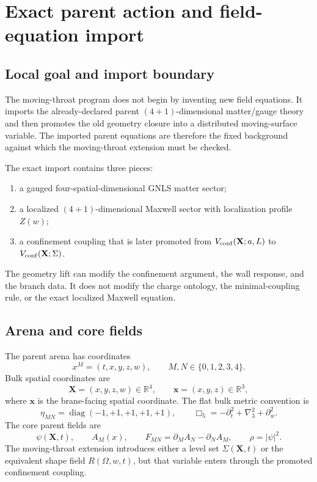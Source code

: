 \section{Exact parent action and field-equation import}
\label{sec:part01_parent_geometry:exact-parent-action-and-field-equation-import}

\subsection{Local goal and import boundary}
\label{subsec:part01-parent-goal}

The moving-throat program does not begin by inventing new field equations.  It imports the already-declared parent \((4+1)\)-dimensional matter/gauge theory and then promotes the old geometry closure into a distributed moving-surface variable.  The imported parent equations are therefore the fixed background against which the moving-throat extension must be checked.

The exact import contains three pieces:
\begin{enumerate}[leftmargin=2.2em]
\item a gauged four-spatial-dimensional GNLS matter sector;
\item a localized \((4+1)\)-dimensional Maxwell sector with localization profile \(Z(w)\);
\item a confinement coupling that is later promoted from \(V_{\rm conf}(\mathbf X;a,L)\) to \(V_{\rm conf}(\mathbf X;\Sigma)\).
\end{enumerate}
The geometry lift can modify the confinement argument, the wall response, and the branch data.  It does not modify the charge ontology, the minimal-coupling rule, or the exact localized Maxwell equation.

\subsection{Arena and core fields}
\label{subsec:part01-parent-arena}

The parent arena has coordinates
\begin{equation}
\label{eq:part01-parent-coordinates}
x^M=(t,x,y,z,w),
\qquad
M,N\in\{0,1,2,3,4\}.
\end{equation}
Bulk spatial coordinates are
\begin{equation}
\mathbf X=(x,y,z,w)\in\mathbb R^4,
\qquad
\mathbf x=(x,y,z)\in\mathbb R^3,
\end{equation}
where \(\mathbf x\) is the brane-facing spatial coordinate.  The flat bulk metric convention is
\begin{equation}
\label{eq:part01-metric}
\eta_{MN}=\operatorname{diag}(-1,+1,+1,+1,+1),
\qquad
\Box_5=-\partial_t^2+\nabla_3^2+\partial_w^2.
\end{equation}
The core parent fields are
\begin{equation}
\psi(\mathbf X,t),
\qquad
A_M(x),
\qquad
F_{MN}=\partial_MA_N-\partial_NA_M,
\qquad
\rho=|\psi|^2.
\end{equation}
The moving-throat extension introduces either a level set \(\Sigma(\mathbf X,t)\) or the equivalent shape field \(R(\Omega,w,t)\), but that variable enters through the promoted confinement coupling.

